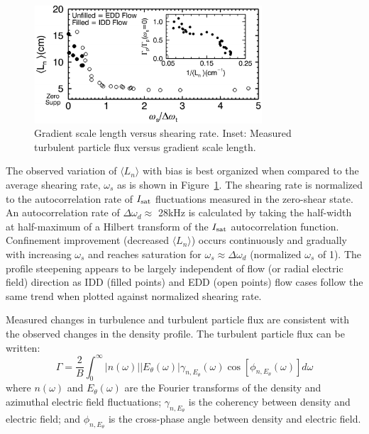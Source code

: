 \documentclass[aps,prl,amsmath,amssymb,preprint,superscriptaddress]{revtex4}
\begin{document}
\begin{figure}[!htbp]
\centerline{
\includegraphics[width=8.5cm]{shearandgrad.pdf}}
\caption{\label{fig:shearandgrad} Gradient scale length versus
  shearing rate. Inset: Measured turbulent particle flux versus
  gradient scale length.}
\end{figure}

The observed variation of $\langle L_{n} \rangle$ with bias is best
organized when compared to the average shearing rate, $\omega_s$ as is
shown in Figure~\ref{fig:shearandgrad}.   The shearing rate is
normalized to the autocorrelation rate of $I_{\rm sat}$ fluctuations
measured in the zero-shear state.  An autocorrelation rate of $\Delta
\omega_{d} \approx $ 28kHz is calculated by taking the half-width at
half-maximum of a Hilbert transform of the $I_{\rm sat}$
autocorrelation function.  Confinement improvement (decreased $\langle
L_n \rangle$) occurs continuously and gradually with increasing
$\omega_{s}$ and reaches saturation for $\omega_{s} \approx \Delta
\omega_{d}$ (normalized $\omega_s$ of 1).  The profile steepening appears to be largely independent of flow (or radial electric field) direction as IDD (filled points) and EDD (open points) flow cases follow the same trend when plotted against normalized shearing rate.

Measured changes in turbulence and turbulent particle flux are
consistent with the observed changes in the density profile.  The
turbulent particle flux can be written\cite{powers74}:
\begin{equation}
\Gamma = \frac{2}{B} \int^{\infty}_{0} \lvert n(\omega) \rvert \lvert E_{\theta}(\omega) \rvert \gamma_{n,E_{\theta}}(\omega) \cos [\phi_{n,E_{\theta}}(\omega)] d\omega
\label{eq:fluxint}
\end{equation}
where $n(\omega)$ and $E_\theta(\omega)$ are the Fourier transforms of
the density and azimuthal electric field fluctuations;
$\gamma_{n,E_\theta}$ is the coherency between density and electric
field; and $\phi_{n,E_\theta}$ is the cross-phase angle between
density and electric field.
\end{document}
